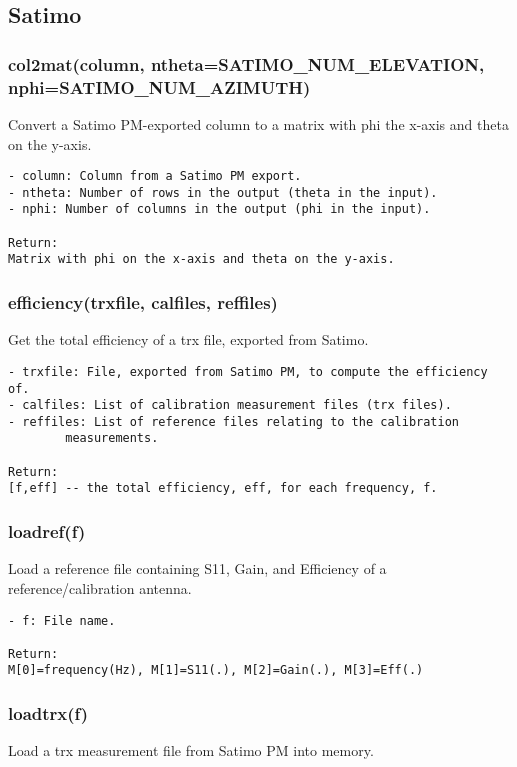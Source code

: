 \subsection{Satimo}
\subsubsection{col2mat(column, ntheta=SATIMO\_NUM\_ELEVATION, nphi=SATIMO\_NUM\_AZIMUTH)}
Convert a Satimo PM-exported column to a matrix with phi the 
x-axis and theta on the y-axis.

\begin{verbatim}
- column: Column from a Satimo PM export.
- ntheta: Number of rows in the output (theta in the input).
- nphi: Number of columns in the output (phi in the input).

Return:
Matrix with phi on the x-axis and theta on the y-axis.
\end{verbatim}

\subsubsection{efficiency(trxfile, calfiles, reffiles)}
Get the total efficiency of a trx file, exported from Satimo.

\begin{verbatim}
- trxfile: File, exported from Satimo PM, to compute the efficiency of.
- calfiles: List of calibration measurement files (trx files).
- reffiles: List of reference files relating to the calibration
        measurements.

Return:
[f,eff] -- the total efficiency, eff, for each frequency, f.
\end{verbatim}

\subsubsection{loadref(f)}
Load a reference file containing S11, Gain, and Efficiency of a
reference/calibration antenna.

\begin{verbatim}
- f: File name.

Return:
M[0]=frequency(Hz), M[1]=S11(.), M[2]=Gain(.), M[3]=Eff(.)
\end{verbatim}

\subsubsection{loadtrx(f)}
Load a trx measurement file from Satimo PM into memory. 

